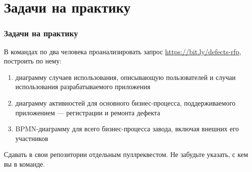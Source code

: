 \documentclass[xetex,mathserif,serif]{beamer}
\begin{document}
    \section{Задачи на практику}

    \begin{frame}
        \frametitle{Задачи на практику}
        В командах по два человека проанализировать запрос \url{https://bit.ly/defects-rfp}, построить по нему:
        \begin{enumerate}
            \item диаграмму случаев использования, описывающую пользователей и случаи использования разрабатываемого приложения
            \item диаграмму активностей для основного бизнес-процесса, поддерживаемого приложением --- регистрации и ремонта дефекта
            \item BPMN-диаграмму для всего бизнес-процесса завода, включая внешних его участников
        \end{enumerate}
        Сдавать в свои репозитории отдельным пуллреквестом. Не забудьте указать, с кем вы в команде.
    \end{frame}
\end{document}
